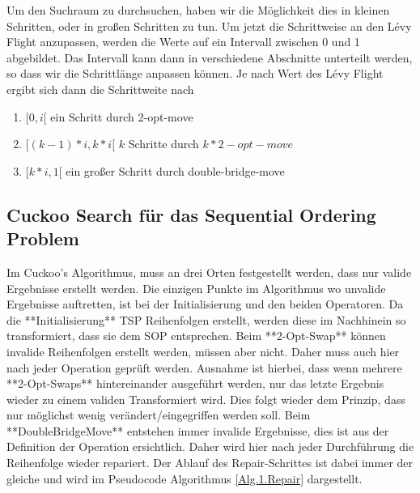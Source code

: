 \documentclass[conference]{IEEEtran}
\begin{document}
      Um den Suchraum zu durchsuchen, haben wir die Möglichkeit dies in kleinen Schritten, 
      oder in großen Schritten zu tun. Um jetzt die Schrittweise an den Lévy Flight anzupassen, 
      werden die Werte auf ein Intervall zwischen 0 und 1 abgebildet. Das Intervall kann dann in 
      verschiedene Abschnitte unterteilt werden, so dass wir die Schrittlänge anpassen können.
      Je nach Wert des Lévy Flight ergibt sich dann die Schrittweite nach
      \begin{enumerate}
        \item$[0,i[$ ein Schritt durch 2-opt-move
        \item$[(k-1)*i, k*i[$ $k$ Schritte durch $k * 2-opt-move$
        \item$[k*i,1[$ ein großer Schritt durch double-bridge-move
      \end{enumerate}


    \label{Implementierung Repair}
    \subsection{Cuckoo Search für das Sequential Ordering Problem}
      Im Cuckoo's Algorithmus, muss an drei Orten festgestellt werden, dass nur valide Ergebnisse erstellt werden. Die einzigen Punkte im 
      Algorithmus wo unvalide Ergebnisse auftretten, ist bei der Initialisierung und den beiden Operatoren. 
      Da die **Initialisierung** TSP Reihenfolgen erstellt, werden diese im Nachhinein so transformiert, dass sie dem SOP entsprechen. 
      Beim **2-Opt-Swap** können invalide Reihenfolgen erstellt werden, müssen aber nicht. Daher muss auch hier nach jeder Operation geprüft werden. 
      Ausnahme ist hierbei, dass wenn mehrere **2-Opt-Swaps** hintereinander ausgeführt werden, nur das letzte Ergebnis wieder zu einem validen Transformiert wird. 
      Dies folgt wieder dem Prinzip, dass nur möglichst wenig verändert/eingegriffen werden soll. 
      Beim **DoubleBridgeMove** entstehen immer invalide Ergebnisse, dies ist aus der Definition der Operation ersichtlich. 
      Daher wird hier nach jeder Durchführung die Reihenfolge wieder repariert. 
      Der Ablauf des Repair-Schrittes ist dabei immer der gleiche und wird im Pseudocode Algorithmus \ref{Alg.1.Repair} dargestellt.
\end{document}

